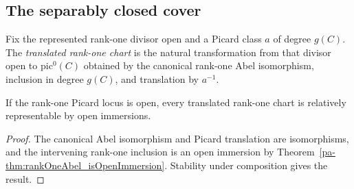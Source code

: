 \subsection{The separably closed cover}

\begin{definition}
  \label{pa-def:pic0TranslatedRankOneOpen}
  \leanok

  Fix the represented rank-one divisor open and a Picard class \(a\) of degree \(g(C)\).
  The \emph{translated rank-one chart} is the natural transformation from that divisor open
  to \(\mathrm{pic}^0(C)\) obtained by the canonical rank-one Abel isomorphism, inclusion in
  degree \(g(C)\), and translation by \(a^{-1}\).
\end{definition}

\begin{theorem}
  \label{pa-thm:pic0TranslatedRankOneOpen_representable}
  \leanok

  If the rank-one Picard locus is open, every translated rank-one chart is relatively
  representable by open immersions.
\end{theorem}
\begin{proof}
  \leanok
  The canonical Abel isomorphism and Picard translation are isomorphisms, and the intervening
  rank-one inclusion is an open immersion by
  Theorem~\ref{pa-thm:rankOneAbel_isOpenImmersion}.  Stability under composition gives the
  result.
\end{proof}

